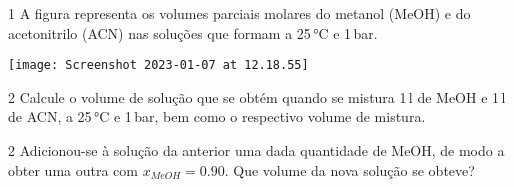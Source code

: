 \documentclass[\mainfilename]{subfiles}
\begin{document}
\begin{questionBox}1{ %
    A figura representa os volumes parciais molares do metanol (MeOH) e do acetonitrilo (ACN) nas soluções que formam a 25\,\unit{\celsius} e 1\,\unit{\bar}.
} %
    \begin{center}
        \texttt{[image: Screenshot 2023-01-07 at 12.18.55]}
    \end{center}
\end{questionBox}

\begin{questionBox}2{ %
    Calcule o volume de solução que se obtém quando se mistura 1\,\unit{\litre} de MeOH e 1\,\unit{\litre} de ACN, a 25\,\unit{\celsius} e 1\,\unit{\bar}, bem como o respectivo volume de mistura.
} %
\end{questionBox}

\begin{questionBox}2{ %
    Adicionou-se à solução da anterior uma dada quantidade de MeOH, de modo a obter uma outra com \(x_{MeOH} = 0.90\). Que volume da nova solução se obteve?
} %
\end{questionBox}
\end{document}
